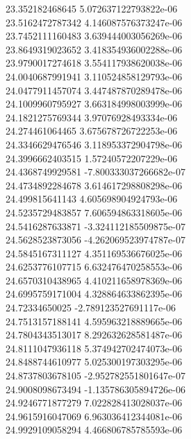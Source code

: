{23.352182468645 5.072637122793822e-06 \\
23.5162472787342 4.146087576373247e-06 \\
23.7452111160483 3.639444003056269e-06 \\
23.8649319023652 3.418354936002288e-06 \\
23.9790017274618 3.554117938620038e-06 \\
24.0040687991941 3.110524858129793e-06 \\
24.0477911457074 3.447487870289478e-06 \\
24.1009960795927 3.663184998003999e-06 \\
24.1821275769344 3.97076928493334e-06 \\
24.274461064465 3.675678726722253e-06 \\
24.3346629476546 3.118953372904798e-06 \\
24.3996662403515 1.57240572207229e-06 \\
24.4368749929581 -7.800333037266682e-07 \\
24.4734892284678 3.614617298808298e-06 \\
24.499815641143 4.605698904924793e-06 \\
24.5235729483857 7.606594863318605e-06 \\
24.5416287633871 -3.324112185509875e-07 \\
24.5628523873056 -4.262069523974787e-07 \\
24.5845167311127 4.351169536676025e-06 \\
24.6253776107715 6.632476470258553e-06 \\
24.6570310438965 4.410211658978369e-06 \\
24.6995759171004 4.328864633862395e-06 \\
24.72334650025 -2.789123527691117e-06 \\
24.7513157188141 4.595963218889665e-06 \\
24.7804343513017 8.292632628581487e-06 \\
24.8111047936118 5.374942702474073e-06 \\
24.8488744610977 5.025300197303295e-06 \\
24.8737803678105 -2.952782551801647e-07 \\
24.9008098673494 -1.135786305894726e-06 \\
24.9246771877279 7.022828413028037e-06 \\
24.9615916047069 6.963036412344081e-06 \\
24.9929109058294 4.466806785785593e-06 \\
}
